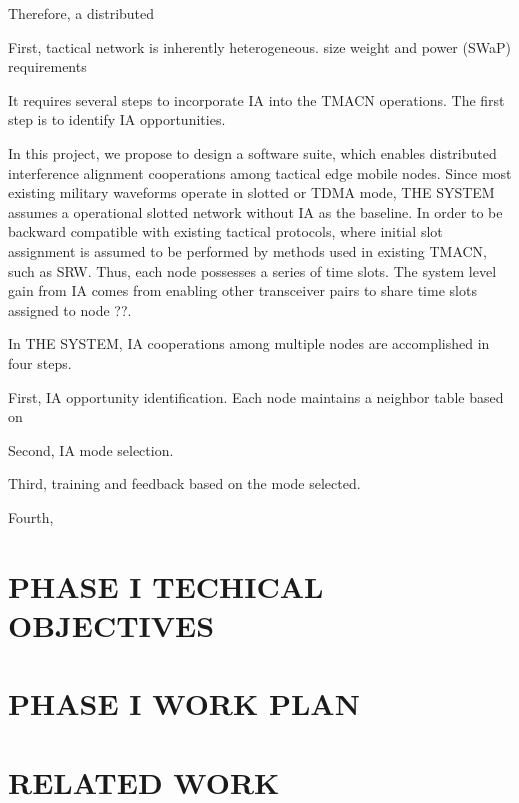 \documentclass[letterpaper,11pt,onecolumn]{article}
\begin{document}
Therefore, a distributed 

First, tactical network is inherently heterogeneous.  size weight and power (SWaP) requirements 





It requires several steps to incorporate IA into the TMACN operations. The first step is to identify IA opportunities. 

In this project, we propose to design a software suite, which enables distributed interference alignment cooperations among tactical edge mobile nodes.  Since most existing military waveforms operate in slotted or TDMA mode, THE SYSTEM assumes a operational slotted network without IA as the baseline. In order to be backward compatible with existing tactical protocols,  where initial slot assignment is assumed to be performed by methods used in existing TMACN, such as SRW. Thus, each node possesses a series of time slots. The system level gain from IA comes from enabling other transceiver pairs to share time slots assigned to node ??. 

In THE SYSTEM, IA cooperations among multiple nodes are accomplished in four steps. 

First, IA opportunity identification. Each node maintains a neighbor table based on 

Second, IA mode selection.

Third, training and feedback based on the mode selected.

Fourth, 


\section{PHASE I TECHICAL OBJECTIVES}

\section{PHASE I WORK PLAN}

\section{RELATED WORK}
\end{document}
